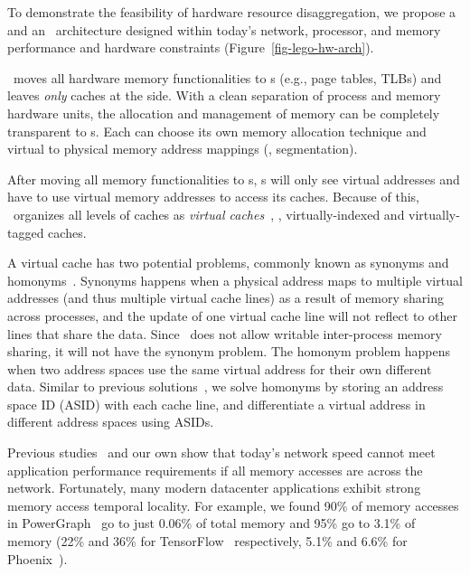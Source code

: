 To demonstrate the feasibility of hardware resource disaggregation,
we propose a \pcomponent{} and an \mcomponent\ architecture designed 
within today's network, processor, and memory performance and hardware constraints
(Figure~\ref{fig-lego-hw-arch}).

\lego\ moves all hardware memory functionalities to \mcomponent{}s 
(e.g., page tables, TLBs) and leaves {\em only} caches at the \pcomponent{} side. 
With a clean separation of process and memory hardware units, 
the allocation and management of memory can be completely transparent to \pcomponent{}s.
Each \mcomponent{} can choose its own memory allocation technique
and virtual to physical memory address mappings (\eg, segmentation). 

After moving all memory functionalities to \mcomponent{}s,  
\pcomponent{}s will only see virtual addresses and have to use virtual memory addresses to access its caches. 
Because of this, \lego\ organizes all levels of \pcomponent{} caches as {\em virtual caches}~\cite{Goodman-ASPLOS87,Wang-ISCA89},
\ie, virtually-indexed and virtually-tagged caches.

A virtual cache has two potential problems, commonly known as synonyms and homonyms~\cite{CacheMemory82}.
Synonyms happens when a physical address maps to multiple virtual addresses (and thus multiple virtual cache lines) 
as a result of memory sharing across processes,
and the update of one virtual cache line will not reflect to other lines that share the data.
Since \lego\ does not allow writable inter-process memory sharing,
it will not have the synonym problem.
The homonym problem happens when two address spaces use the same virtual address for their own different data.
Similar to previous solutions~\cite{OVC}, we solve homonyms by storing an address space ID (ASID) with each cache line,
and differentiate a virtual address in different address spaces using ASIDs.

Previous studies~\cite{Gao16-OSDI,GU17-NSDI} and our own show that today's network speed 
cannot meet application performance requirements if all memory accesses are across the network. 
Fortunately, many modern datacenter applications exhibit strong memory access temporal locality.
For example, we found 90\% of memory accesses in PowerGraph~\cite{Gonzalez12-OSDI} go to just 0.06\% of total memory
and 95\% go to 3.1\% of memory
(22\% and 36\% for TensorFlow~\cite{TensorFlow} respectively,
5.1\% and 6.6\% for Phoenix~\cite{Ranger07-HPCA}).


